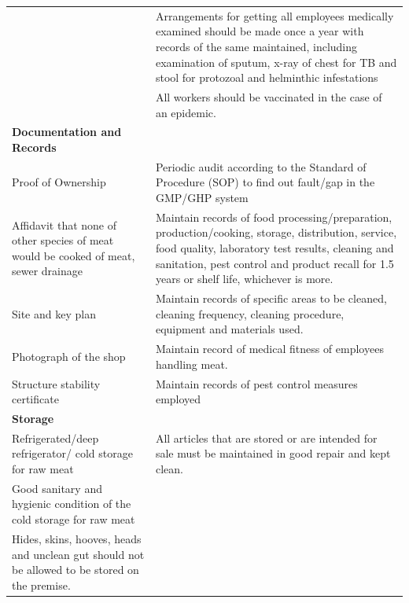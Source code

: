\documentclass[a4paper, 12pt, twoside]{article}
\newcommand\tabitem{\makebox[1em][r]{\textbullet~}}
\begin{document}
\begin{longtable}[l]{>{\raggedright}p{6.5cm}>{\raggedright\arraybackslash}p{8.5cm}}
	&	\newline{}\tabitem Arrangements for getting all employees medically examined should be made once a year with records of the same maintained, including examination of sputum, x-ray of chest for TB and stool for protozoal and helminthic infestations\\
	&	\newline{}\tabitem All workers should be vaccinated in the case of an epidemic. \\
\midrule
   \textbf{Documentation and Records}	&	\\
    \midrule
    \tabitem Proof of Ownership	&	\tabitem Periodic audit according to the Standard of Procedure (SOP) to find out fault/gap in the GMP/GHP system\\
\newline{}\tabitem Affidavit that none of other species of meat would be cooked of meat, sewer drainage	&	\newline{}\tabitem Maintain records of food processing/preparation, production/cooking, storage, distribution, service, food quality, laboratory test results, cleaning and sanitation, pest control and product recall for 1.5 years or shelf life, whichever is more.\\
\newline{}\tabitem Site and key plan	&	\newline{}\tabitem Maintain records of specific areas to be cleaned, cleaning frequency, cleaning procedure, equipment and materials used.\\
\newline{}\tabitem Photograph of the shop	&	\newline{}\tabitem Maintain record of medical fitness of employees handling meat.\\
\newline{}\tabitem Structure stability certificate	&	\newline{}\tabitem Maintain records of pest control measures employed \\
    \midrule
    \textbf{Storage}	&	\\
    \midrule
    \tabitem Refrigerated/deep refrigerator/ cold storage for raw meat	&   \tabitem All articles that are stored or are intended for sale must be maintained in good repair and kept clean.\\
	\newline{}\tabitem Good sanitary and hygienic condition of the cold storage for raw meat 	&	\\	\newline{}\tabitem Hides, skins, hooves, heads and unclean gut should not be allowed to be stored on the premise.\\

\end{longtable}
\end{document}
